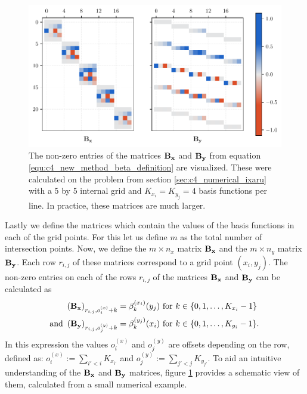 \begin{figure}
    \begin{center}
        \includegraphics[width=\textwidth]{img/chapter4/new_method_beta.pdf}
        \caption{The non-zero entries of the matrices $\vb{B_x}$ and $\vb{B_y}$ from equation \eqref{equ:c4_new_method_beta_definition} are visualized. These were calculated on the problem from section \ref{sec:c4_numerical_ixaru} with a 5 by 5 internal grid and $K_{x_i} = K_{y_j} = 4$ basis functions per line. In practice, these matrices are much larger.}
        \label{fig:c4_new_method_beta}
    \end{center}
\end{figure}

Lastly we define the matrices which contain the values of the basis functions in each of the grid points. For this let us define $m$ as the total number of intersection points. Now, we define the $m \times n_x$ matrix $\vb{B_x}$ and the $m \times n_y$ matrix $\vb{B_y}$. Each row $r_{i,j}$ of these matrices correspond to a grid point $(x_i, y_j)$. The non-zero entries on each of the rows $r_{i,j}$ of the matrices $\vb{B_x}$ and $\vb{B_y}$ can be calculated as
\begin{align}
    \left(\vb{B_x}\right)_{r_{i,j}, o^{(x)}_{i} + k} & =  \beta_{k}^{(x_i)}(y_j) \text{ for $k \in \{0, 1, \dots, K_{x_i} - 1\}$ }   \nonumber                               \\
    \text{and }
    \left(\vb{B_y}\right)_{r_{i,j}, o^{(y)}_{j} + k} & =  \beta_{k}^{(y_j)}(x_i) \text{ for $k \in \{0, 1, \dots, K_{y_i} - 1\}$.} \label{equ:c4_new_method_beta_definition}
\end{align}
In this expression the values $o^{(x)}_{i}$ and $o^{(y)}_{j}$ are offsets depending on the row, defined as: $o^{(x)}_{i} := \sum_{i' < i} K_{x_{i'}}$ and $o^{(y)}_{j} := \sum_{j' < j} K_{y_{j'}}$. To aid an intuitive understanding of the $\vb{B_x}$ and $\vb{B_y}$ matrices, figure \ref{fig:c4_new_method_beta} provides a schematic view of them, calculated from a small numerical example.


